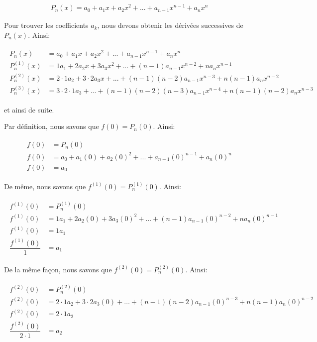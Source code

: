 \documentclass[]{book}
\theoremstyle{definition}
\theoremstyle{definition}
\theoremstyle{definition}
\theoremstyle{remark}
\begin{document}
\begin{align*}
P_n(x)=a_0+a_1x+a_2x^2+...+a_{n-1}x^{n-1}+a_nx^n
\end{align*}

Pour trouver les coefficients \(a_k\), nous devons obtenir les dérivées
successives de \(P_n(x)\). Ainsi:

\begin{align}
\begin{split}
P_n(x) &= a_0+a_1x+a_2x^2+...+a_{n-1}x^{n-1}+a_nx^n \\
P_n^{(1)}(x) &= 1a_1+2a_2x+3a_3x^2+...+(n-1)a_{n-1}x^{n-2}+na_nx^{n-1} \\
P_n^{(2)}(x) &= 2\cdot 1a_2+3\cdot 2a_3x+...+(n-1)(n-2)a_{n-1}x^{n-3}+n(n-1)a_nx^{n-2} \\
P_n^{(3)}(x) &= 3\cdot 2\cdot 1a_3+...+(n-1)(n-2)(n-3)a_{n-1}x^{n-4}+n(n-1)(n-2)a_nx^{n-3}
\end{split}
\end{align}

et ainsi de suite.

Par définition, nous savons que \(f(0)=P_n(0)\). Ainsi:

\begin{align}
\begin{split}
f(0)&=P_n(0) \\
f(0) &= a_0+a_1(0)+a_2(0)^2+...+a_{n-1}(0)^{n-1}+a_n(0)^n \\
f(0)&=a_0
\end{split}
\end{align}

De même, nous savons que \(f^{(1)}(0)=P_n^{(1)}(0)\). Ainsi:

\begin{align}
\begin{split}
f^{(1)}(0)&=P_n^{(1)}(0)\\
f^{(1)}(0)&=1a_1+2a_2(0)+3a_3(0)^2+...+(n-1)a_{n-1}(0)^{n-2}+na_n(0)^{n-1} \\
f^{(1)}(0)&=1a_1  \\
\dfrac{f^{(1)}(0)}{1}&=a_1
\end{split}
\end{align}

De la même façon, nous savons que \(f^{(2)}(0)=P_n^{(2)}(0)\). Ainsi:

\begin{align}
\begin{split}
f^{(2)}(0)&=P^{(2)}_n(0)\\
f^{(2)}(0)&=2\cdot 1a_2+3\cdot 2a_3(0)+\ldots+(n-1)(n-2)a_{n-1}(0)^{n-3}+n(n-1)a_n(0)^{n-2} \\
f^{(2)}(0)&=2\cdot 1a_2  \\
\dfrac{f^{(2)}(0)}{2\cdot 1}&=a_2
\end{split}
\end{align}
\end{document}
